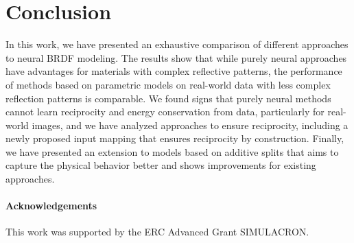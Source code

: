 \section{Conclusion}
In this work, we have presented an exhaustive comparison of different approaches to neural BRDF modeling. The results show that while purely neural approaches have advantages for materials with complex reflective patterns, the performance of methods based on parametric models on real-world data with less complex reflection patterns is comparable.
We found signs that purely neural methods cannot learn reciprocity and energy conservation from data, particularly for real-world images, and we have analyzed approaches to ensure reciprocity, including a newly proposed input mapping that ensures reciprocity by construction.
Finally, we have presented an extension to models based on additive splits that aims to capture the physical behavior better and shows improvements for existing approaches.

{
\small
\paragraph{Acknowledgements}
This work was supported by the ERC Advanced Grant SIMULACRON.
}